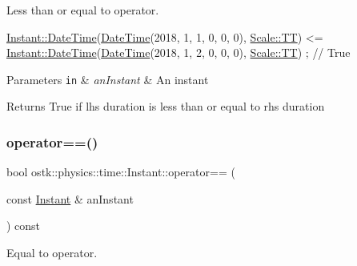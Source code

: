 Less than or equal to operator. 


\begin{DoxyCode}
\hyperlink{classostk_1_1physics_1_1time_1_1_instant_afd5725574a02389b80fad4baff313c8a}{Instant::DateTime}(\hyperlink{classostk_1_1physics_1_1time_1_1_instant_afd5725574a02389b80fad4baff313c8a}{DateTime}(2018, 1, 1, 0, 0, 0), 
      \hyperlink{namespaceostk_1_1physics_1_1time_adf23d37bd8641fb76a0e98ab46a70df7adf1f3edb9115acb0a1e04209b7a9937b}{Scale::TT}) <= \hyperlink{classostk_1_1physics_1_1time_1_1_instant_afd5725574a02389b80fad4baff313c8a}{Instant::DateTime}(\hyperlink{classostk_1_1physics_1_1time_1_1_instant_afd5725574a02389b80fad4baff313c8a}{DateTime}(2018, 1, 2, 0, 0, 0), 
      \hyperlink{namespaceostk_1_1physics_1_1time_adf23d37bd8641fb76a0e98ab46a70df7adf1f3edb9115acb0a1e04209b7a9937b}{Scale::TT}) ; \textcolor{comment}{// True}
\end{DoxyCode}



\begin{DoxyParams}[1]{Parameters}
\mbox{\tt in}  & {\em an\+Instant} & An instant \\
\hline
\end{DoxyParams}
\begin{DoxyReturn}{Returns}
True if lhs duration is less than or equal to rhs duration 
\end{DoxyReturn}
\mbox{\label{classostk_1_1physics_1_1time_1_1_instant_a701dd98cce0e8b7536aab09555a889f2}} 
\subsubsection{\texorpdfstring{operator==()}{operator==()}}
{\footnotesize\ttfamily bool ostk\+::physics\+::time\+::\+Instant\+::operator== (\begin{DoxyParamCaption}\item[{const \hyperlink{classostk_1_1physics_1_1time_1_1_instant}{Instant} \&}]{an\+Instant }\end{DoxyParamCaption}) const}



Equal to operator. 


